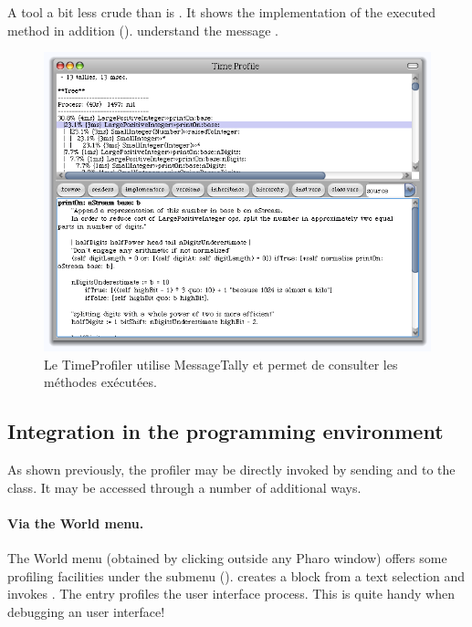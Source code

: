\documentclass[a4paper,10pt,twoside]{book}
\begin{document}
A tool a bit less crude than  is . It shows the implementation of the executed method in addition ().   understand the message .


\begin{figure}
	\begin{center}
	\includegraphics[width=.8\linewidth]{TimeProfiler}
	\caption{Le TimeProfiler utilise MessageTally et permet de consulter les m\'ethodes ex\'ecut\'ees.
	}
	\end{center}
\end{figure}


\subsection{Integration in the programming environment}
As shown previously, the profiler may be directly invoked by sending  and  to the  class. It may be accessed through a number of additional ways.

\paragraph{Via the World menu.}
The World menu (obtained by clicking outside any Pharo window) offers some profiling facilities under the  submenu ().  creates a block from a text selection and invokes . The entry  profiles the user interface process. This is quite handy when debugging an user interface!
\end{document}
